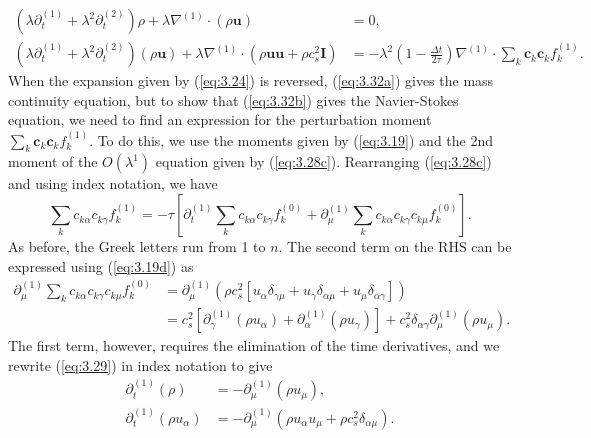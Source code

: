 \documentclass[a4paper, 11pt]{report}
\begin{document}
\begin{subequations} \label{eq:3.32}
\begin{align}
\left(\lambda \partial_t^{(1)} + \lambda^2 \partial_t^{(2)}\right)\rho + \lambda\nabla^{(1)}\cdot(\rho\mathbf{u}) &= 0, \label{eq:3.32a}\\
\left(\lambda \partial_t^{(1)} + \lambda^2 \partial_t^{(2)}\right)(\rho\mathbf{u}) + \lambda\nabla^{(1)}\cdot\left( \rho\mathbf{u}\mathbf{u} + \rho c_s^2 \mathbf{I}\right) &= -\lambda^2\left(1-\frac{\Delta t}{2\tau}\right)\nabla^{(1)}\cdot\sum_k\mathbf{c}_k\mathbf{c}_kf_k^{(1)}. \label{eq:3.32b}
\end{align}
\end{subequations}
When the expansion given by (\ref{eq:3.24}) is reversed, (\ref{eq:3.32a}) gives the mass continuity equation, but to show that (\ref{eq:3.32b}) gives the Navier-Stokes equation, we need to find an expression for the perturbation moment $\sum_k\mathbf{c}_k\mathbf{c}_kf_k^{(1)}$. To do this, we use the moments given by (\ref{eq:3.19}) and the 2nd moment of the $O(\lambda^1)$ equation given by (\ref{eq:3.28c}). Rearranging (\ref{eq:3.28c}) and using index notation, we have
\begin{equation}
    \sum_kc_{k\alpha}c_{k\gamma}f_k^{(1)} = -\tau\left[\partial_t^{(1)}\sum_kc_{k\alpha}c_{k\gamma}f_k^{(0)} + \partial_\mu^{(1)}\sum_kc_{k\alpha}c_{k\gamma}c_{k\mu}f_k^{(0)}\right]. \label{eq:3.33}
\end{equation}
As before, the Greek letters run from 1 to $n$. The second term on the RHS can be expressed using (\ref{eq:3.19d}) as
\begin{align}
    \partial_\mu^{(1)}\sum_kc_{k\alpha}c_{k\gamma}c_{k\mu}f_k^{(0)} &= \partial_\mu^{(1)}\left(\rho c_s^2\left[u_\alpha\delta_{\gamma\mu} + u_\gamma\delta_{\alpha\mu} + u_\mu\delta_{\alpha\gamma}\right]\right) \nonumber \\
    &= c_s^2\left[\partial_\gamma^{(1)}(\rho u_\alpha) + \partial_\alpha^{(1)}(\rho u_\gamma)\right] + c_s^2\delta_{\alpha\gamma}\partial_\mu^{(1)}(\rho u_\mu). \label{eq:3.34}
\end{align}
The first term, however, requires the elimination of the time derivatives, and we rewrite (\ref{eq:3.29}) in index notation to give
\begin{subequations} \label{eq:3.35}
\begin{align}
    \partial_t^{(1)}(\rho) &= -\partial_\mu^{(1)}(\rho u_\mu), \label{eq:3.35a} \\
    \partial_t^{(1)}(\rho u_\alpha) &= -\partial_\mu^{(1)}\left( \rho u_\alpha u_\mu + \rho c_s^2 \delta_{\alpha\mu}\right). \label{eq:3.35b}
\end{align}
\end{subequations}
\end{document}
